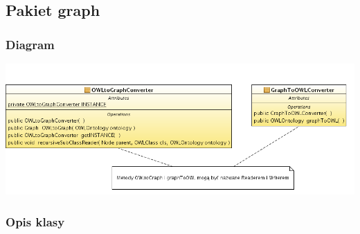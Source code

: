 \subsection{Pakiet graph}

\subsubsection{Diagram}

\includegraphics[width=\linewidth]{./modelowanie/OV_UML/GraphClassDiagram.png}

\subsubsection{Opis klasy}


